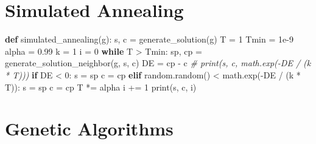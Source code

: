 \documentclass[12pt]{article}
\newenvironment{Shaded}{}{}
\newcommand{\KeywordTok}[1]{\textcolor[rgb]{0.00,0.44,0.13}{\textbf{{#1}}}}
\newcommand{\DecValTok}[1]{\textcolor[rgb]{0.25,0.63,0.44}{{#1}}}
\newcommand{\FloatTok}[1]{\textcolor[rgb]{0.25,0.63,0.44}{{#1}}}
\newcommand{\CommentTok}[1]{\textcolor[rgb]{0.38,0.63,0.69}{\textit{{#1}}}}
\newcommand{\NormalTok}[1]{{#1}}
\newcommand{\ControlFlowTok}[1]{\textcolor[rgb]{0.00,0.44,0.13}{\textbf{{#1}}}}
\newcommand{\OperatorTok}[1]{\textcolor[rgb]{0.40,0.40,0.40}{{#1}}}
\newcommand{\BuiltInTok}[1]{{#1}}
\begin{document}
    \section{Simulated Annealing}\label{simulated-annealing}

\begin{Shaded}
\begin{Highlighting}[]
\KeywordTok{def} \NormalTok{simulated_annealing(g):}
    \NormalTok{s, c }\OperatorTok{=} \NormalTok{generate_solution(g)}
    \NormalTok{T }\OperatorTok{=} \DecValTok{1}
    \NormalTok{Tmin }\OperatorTok{=} \FloatTok{1e-9}
    \NormalTok{alpha }\OperatorTok{=} \FloatTok{0.99}
    \NormalTok{k }\OperatorTok{=} \DecValTok{1}
    \NormalTok{i }\OperatorTok{=} \DecValTok{0}
    \ControlFlowTok{while} \NormalTok{T }\OperatorTok{>} \NormalTok{Tmin:}
        \NormalTok{sp, cp }\OperatorTok{=} \NormalTok{generate_solution_neighbor(g, s, c)}
        \NormalTok{DE }\OperatorTok{=} \NormalTok{cp }\OperatorTok{-} \NormalTok{c}
        \CommentTok{# print(s, c, math.exp(-DE / (k * T)))}
        \ControlFlowTok{if} \NormalTok{DE }\OperatorTok{<} \DecValTok{0}\NormalTok{:}
            \NormalTok{s }\OperatorTok{=} \NormalTok{sp}
            \NormalTok{c }\OperatorTok{=} \NormalTok{cp}
        \ControlFlowTok{elif} \NormalTok{random.random() }\OperatorTok{<} \NormalTok{math.exp(}\OperatorTok{-}\NormalTok{DE }\OperatorTok{/} \NormalTok{(k }\OperatorTok{*} \NormalTok{T)):}
            \NormalTok{s }\OperatorTok{=} \NormalTok{sp}
            \NormalTok{c }\OperatorTok{=} \NormalTok{cp}
        \NormalTok{T }\OperatorTok{*=} \NormalTok{alpha}
        \NormalTok{i }\OperatorTok{+=} \DecValTok{1}
    \BuiltInTok{print}\NormalTok{(s, c, i)}
\end{Highlighting}
\end{Shaded}

    \section{Genetic Algorithms}\label{genetic-algorithms}
\end{document}
